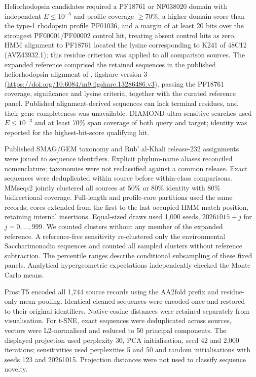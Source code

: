 Heliorhodopsin candidates required a PF18761 or NF038020 domain with independent $E\leq10^{-5}$ and profile coverage $\geq70\%$, a higher domain score than the type-1 rhodopsin profile PF01036, and a margin of at least 20 bits over the strongest PF00001/PF00002 control hit, treating absent control hits as zero. HMM alignment to PF18761 located the lysine corresponding to K241 of 48C12 (AVZ43932.1); this residue criterion was applied to all comparison sources. The expanded reference comprised the retained sequences in the published heliorhodopsin alignment of \citet{bulzu2021heliorhodopsin}, figshare version 3 (\url{https://doi.org/10.6084/m9.figshare.13286486.v3}), passing the PF18761 coverage, significance and lysine criteria, together with the curated reference panel. Published alignment-derived sequences can lack terminal residues, and their gene completeness was unavailable. DIAMOND ultra-sensitive searches used $E\leq10^{-3}$ and at least 70\% span coverage of both query and target; identity was reported for the highest-bit-score qualifying hit.

Published SMAG/GEM taxonomy and Rub' al-Khali release-232 assignments were joined to sequence identifiers. Explicit phylum-name aliases reconciled nomenclature; taxonomies were not reclassified against a common release. Exact sequences were deduplicated within source before within-class comparisons. MMseqs2 jointly clustered all sources at 50\% or 80\% identity with 80\% bidirectional coverage. Full-length and profile-core partitions used the same records; cores extended from the first to the last occupied HMM match position, retaining internal insertions. Equal-sized draws used 1{,}000 seeds, $20261015+j$ for $j=0,\ldots,999$. We counted clusters without any member of the expanded reference. A reference-free sensitivity re-clustered only the environmental Saccharimonadia sequences and counted all sampled clusters without reference subtraction. The percentile ranges describe conditional subsampling of these fixed panels. Analytical hypergeometric expectations independently checked the Monte Carlo means.

ProstT5 \citep{heinzinger2024prostt5} encoded all 1{,}744 source records using the AA2fold prefix and residue-only mean pooling. Identical cleaned sequences were encoded once and restored to their original identifiers. Native cosine distances were retained separately from visualisation. For t-SNE, exact sequences were deduplicated across sources, vectors were L2-normalised and reduced to 50 principal components. The displayed projection used perplexity 30, PCA initialisation, seed 42 and 2{,}000 iterations; sensitivities used perplexities 5 and 50 and random initialisations with seeds 123 and 20261015. Projection distances were not used to classify sequence novelty.

